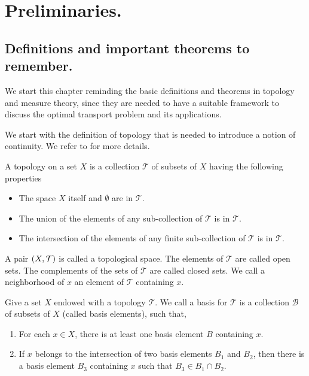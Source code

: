 \chapter{Preliminaries.}
\section{Definitions and important theorems to remember.}

We start this chapter reminding the basic definitions and theorems in topology and measure theory, since they are needed to have a suitable framework to discuss the optimal transport problem and its applications. 

We start with the definition of topology that is needed to introduce a notion of continuity. We refer to \cite{munkres2000topology} for more details.
\begin{definition}[Topology]
	A topology on a set $X$ is a collection $\mathcal T$ of subsets of $X$ having the following properties
	\begin{itemize}
		\item  The space $X$ itself and $\emptyset$ are in $\mathcal T$.
		\item  The union of the elements of any sub-collection of $\mathcal T$ is in $\mathcal T$.
		\item The intersection of the elements of any finite sub-collection of $\mathcal T$ is in $\mathcal T$.
	\end{itemize}
\end{definition}

A pair $\left( X, \mathcal{T} \right)$ is called a topological space. The elements of $\mathcal T$ are called open sets. The complements of the sets of $\mathcal T$ are called closed sets. We call a neighborhood of $x$ an element of $\mathcal{T}$ containing $x$.

\begin{definition}
	Give a set $X$ endowed with a topology $\mathcal T$. We call a basis for $\mathcal{T}$ is a collection $\mathcal{B}$ of subsets of $X$ (called basis elements), such that,
	\begin{enumerate}
		\item  For each $x\in X$, there is at least one basis element $B$ containing $x$. 
		\item  If $x$ belongs to the intersection of two basis elements $B_1$ and $B_2$, then there is a basis element $B_3$ containing $x$ such that $B_3 \in B_1 \cap B_2$. 
	\end{enumerate}
\end{definition}

